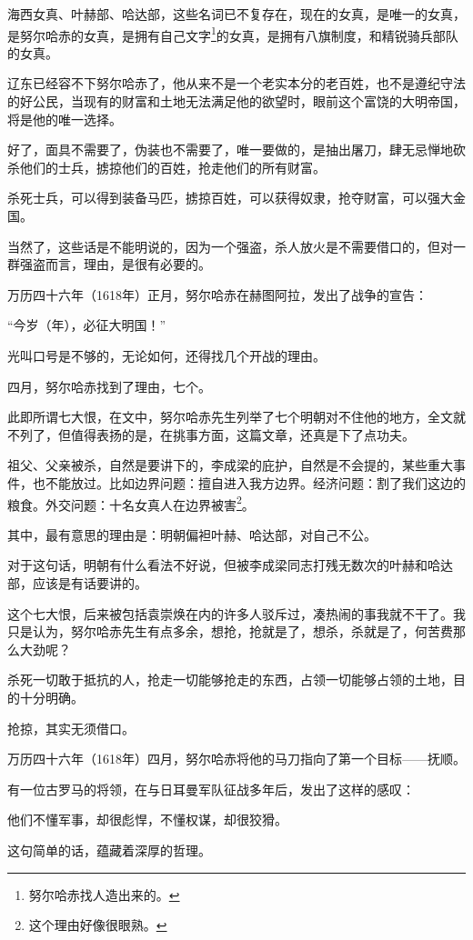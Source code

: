 \begin{multicols}{\theparacolNo}
		海西女真、叶赫部、哈达部，这些名词已不复存在，现在的女真，是唯一的女真，是努尔哈赤的女真，是拥有自己文字\footnote{努尔哈赤找人造出来的。}的女真，是拥有八旗制度，和精锐骑兵部队的女真。

		辽东已经容不下努尔哈赤了，他从来不是一个老实本分的老百姓，也不是遵纪守法的好公民，当现有的财富和土地无法满足他的欲望时，眼前这个富饶的大明帝国，将是他的唯一选择。

		好了，面具不需要了，伪装也不需要了，唯一要做的，是抽出屠刀，肆无忌惮地砍杀他们的士兵，掳掠他们的百姓，抢走他们的所有财富。

		杀死士兵，可以得到装备马匹，掳掠百姓，可以获得奴隶，抢夺财富，可以强大金国。

		当然了，这些话是不能明说的，因为一个强盗，杀人放火是不需要借口的，但对一群强盗而言，理由，是很有必要的。

		万历四十六年（1618年）正月，努尔哈赤在赫图阿拉，发出了战争的宣告：

		“今岁（年），必征大明国！”

		光叫口号是不够的，无论如何，还得找几个开战的理由。

		四月，努尔哈赤找到了理由，七个。

		此即所谓七大恨，在文中，努尔哈赤先生列举了七个明朝对不住他的地方，全文就不列了，但值得表扬的是，在挑事方面，这篇文章，还真是下了点功夫。

		祖父、父亲被杀，自然是要讲下的，李成梁的庇护，自然是不会提的，某些重大事件，也不能放过。比如边界问题：擅自进入我方边界。经济问题：割了我们这边的粮食。外交问题：十名女真人在边界被害\footnote{这个理由好像很眼熟。}。

		其中，最有意思的理由是：明朝偏袒叶赫、哈达部，对自己不公。

		对于这句话，明朝有什么看法不好说，但被李成梁同志打残无数次的叶赫和哈达部，应该是有话要讲的。

		这个七大恨，后来被包括袁崇焕在内的许多人驳斥过，凑热闹的事我就不干了。我只是认为，努尔哈赤先生有点多余，想抢，抢就是了，想杀，杀就是了，何苦费那么大劲呢？

		杀死一切敢于抵抗的人，抢走一切能够抢走的东西，占领一切能够占领的土地，目的十分明确。

		抢掠，其实无须借口。

		万历四十六年（1618年）四月，努尔哈赤将他的马刀指向了第一个目标——抚顺。

		有一位古罗马的将领，在与日耳曼军队征战多年后，发出了这样的感叹：

		他们不懂军事，却很彪悍，不懂权谋，却很狡猾。

		这句简单的话，蕴藏着深厚的哲理。


\end{multicols}
